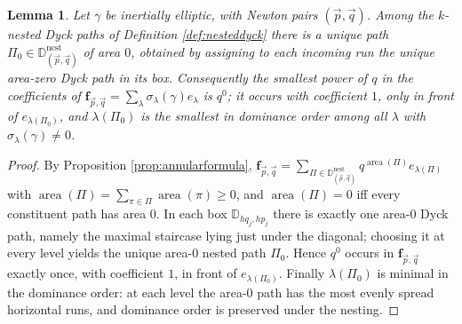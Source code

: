 \documentclass{amsart}
\numberwithin{equation}{section}
\newtheorem{lemma}{Lemma}[section]
\theoremstyle{definition}
\newcommand{\frs}{\mathbf{f}_{\vec{p},\vec{q}}}
\newcommand{\fpq}{\frs}
\newcommand{\Dyck}{\mathbb{D}}
\newcommand{\nDyck}{\mathbb{D}^{\mathrm{nest}}}
\DeclareMathOperator{\area}{\mathrm{area}}
\begin{document}
\begin{lemma}
\label{lem:smallestpower}
Let $\gamma$ be inertially elliptic, with Newton pairs $(\vec p,\vec q)$. Among the $k$-nested Dyck paths of Definition \ref{def:nesteddyck} there is a unique path $\Pi_0\in\nDyck_{(\vec p,\vec q)}$ of area $0$, obtained by assigning to each incoming run the unique area-zero Dyck path in its box. Consequently the smallest power of $q$ in the coefficients of $\fpq=\sum_\lambda\sigma_\lambda(\gamma)e_\lambda$ is $q^0$; it occurs with coefficient $1$, only in front of $e_{\lambda(\Pi_0)}$, and $\lambda(\Pi_0)$ is the smallest in dominance order among all $\lambda$ with $\sigma_\lambda(\gamma)\neq0$.
\end{lemma}
\begin{proof}
By Proposition \ref{prop:annularformula}, $\fpq=\sum_{\Pi\in\nDyck_{(\vec p,\vec q)}}q^{\area(\Pi)}e_{\lambda(\Pi)}$ with $\area(\Pi)=\sum_{\pi\in\Pi}\area(\pi)\ge0$, and $\area(\Pi)=0$ iff every constituent path has area $0$. In each box $\Dyck_{hq_j,hp_j}$ there is exactly one area-$0$ Dyck path, namely the maximal staircase lying just under the diagonal; choosing it at every level yields the unique area-$0$ nested path $\Pi_0$. Hence $q^0$ occurs in $\fpq$ exactly once, with coefficient $1$, in front of $e_{\lambda(\Pi_0)}$. Finally $\lambda(\Pi_0)$ is minimal in the dominance order: at each level the area-$0$ path has the most evenly spread horizontal runs, and dominance order is preserved under the nesting.
\end{proof}
\end{document}
